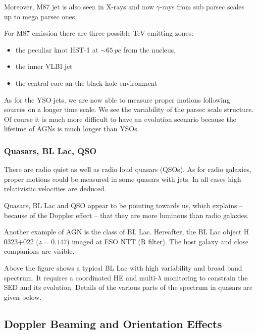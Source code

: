\documentclass[10pt,a4paper,english]{article}
\begin{document}
Moreover, M87 jet is also seen in X-rays and now $\gamma$-rays from
sub parsec scales up to mega parsec ones.


For M87 emission there are three possible \si{TeV} emitting zones:
\begin{itemize}
\item the peculiar knot HST-1 at $\sim \SI{65}{pc}$ from the nucleus,
\item the inner VLBI jet
\item the central core an the black hole environment
\end{itemize}
As for the YSO jets, we are now able to measure proper motions
following sources on a longer time scale. We see the variability of
the parsec scale structure. Of course it is much more difficult to
have an evolution scenario because the lifetime of AGNs is much longer
than YSOs.
\subsubsection{Quasars, BL Lac, QSO}
There are radio quiet as well as radio loud quasars (QSOs). As for
radio galaxies, proper motions could be measured in some quasars with
jets. In all cases high relativistic velocities are deduced.

Quasars, BL Lac and QSO appear to be pointing towards us, which
explains -- because of the Doppler effect -- that they are more
luminous than radio galaxies.


Another example of AGN is the class of BL Lac. Hereafter, the BL Lac
object H 0323+022 ($z = 0.147$) imaged at ESO NTT (R filter). The host
galaxy and close companions are visible.

Above the figure shows a typical BL Lac with high variability and
broad band spectrum. It requires a coordinated HE and multi-$\lambda$
monitoring to constrain the SED and its evolution. Details of the
various parts of the spectrum in quasars are given below.
\subsection{Doppler Beaming and Orientation Effects}
\end{document}
